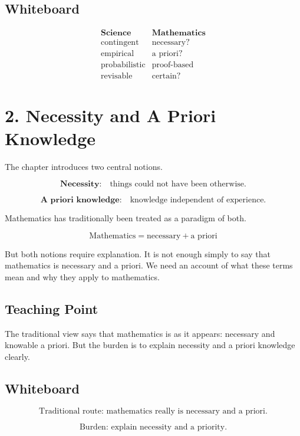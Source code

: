 \documentclass[11pt]{article}
\begin{document}
\subsection*{Whiteboard}

\[
\begin{array}{c|c}
\textbf{Science} & \textbf{Mathematics} \\
\hline
\text{contingent} & \text{necessary?} \\
\text{empirical} & \text{a priori?} \\
\text{probabilistic} & \text{proof-based} \\
\text{revisable} & \text{certain?}
\end{array}
\]

\section*{2. Necessity and A Priori Knowledge}

The chapter introduces two central notions.

\[
\textbf{Necessity:}
\quad
\text{things could not have been otherwise.}
\]

\[
\textbf{A priori knowledge:}
\quad
\text{knowledge independent of experience.}
\]

Mathematics has traditionally been treated as a paradigm of both.

\[
\text{Mathematics} = \text{necessary} + \text{a priori}
\]

But both notions require explanation. It is not enough simply to say that mathematics is
necessary and a priori. We need an account of what these terms mean and why they apply
to mathematics.

\subsection*{Teaching Point}

The traditional view says that mathematics is as it appears: necessary and knowable
a priori. But the burden is to explain necessity and a priori knowledge clearly.

\subsection*{Whiteboard}

\[
\boxed{
\text{Traditional route: mathematics really is necessary and a priori.}
}
\]

\[
\boxed{
\text{Burden: explain necessity and a priority.}
}
\]
\end{document}
